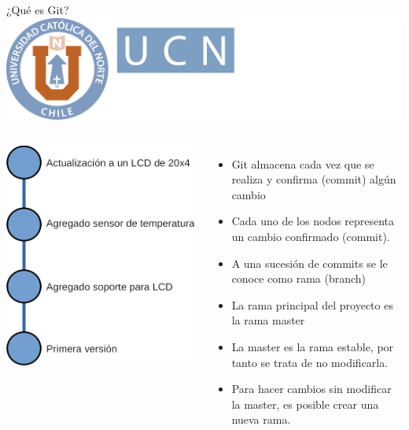 \documentclass[12pt,a4paper,usenames,x11names,compress]{beamer}
\begin{document}
\begin{frame}{¿Qué es Git?\hfill \includegraphics[scale=.1]{eciem.png}}
\begin{columns}
\includegraphics[scale=.23]{commit.png} 
\begin{itemize}
\justifying
 \item Git almacena cada vez que se realiza y confirma (commit) algún cambio
 \item Cada uno de los nodos representa un cambio confirmado (commit).
 \item A una sucesión de commits se le conoce como rama (branch)
 \item La rama principal del proyecto es la rama master
 \item La master es la rama estable, por tanto se trata de no modificarla.
 \item Para hacer cambios sin modificar la master, es posible crear una nueva rama.
\end{itemize}
\end{columns}
\end{frame}
\end{document}
